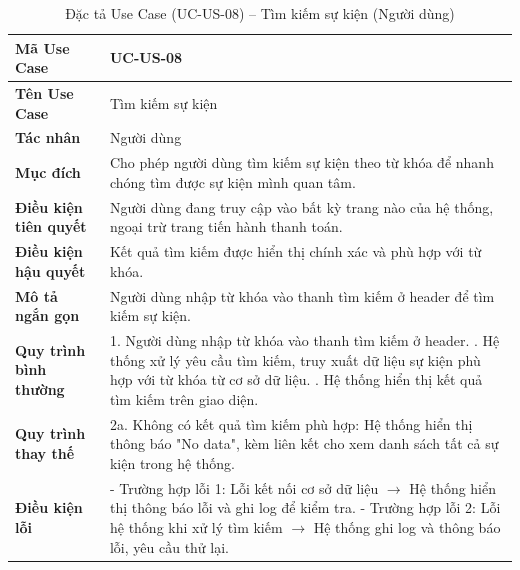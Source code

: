 \renewcommand{\arraystretch}{1.3}
\setlength{\tabcolsep}{4pt}
\begin{longtable}{|p{}|p{}|}
\caption{Đặc tả Use Case (UC-US-08) -- Tìm kiếm sự kiện (Người dùng) }\label{tab:uc_search_event}\\
\hline
\textbf{Mã Use Case} & UC-US-08 \\ \hline
\textbf{Tên Use Case} & Tìm kiếm sự kiện \\ \hline
\textbf{Tác nhân} & Người dùng \\ \hline
\textbf{Mục đích} & Cho phép người dùng tìm kiếm sự kiện theo từ khóa để nhanh chóng tìm được sự kiện mình quan tâm. \\ \hline
\textbf{Điều kiện tiên quyết} & Người dùng đang truy cập vào bất kỳ trang nào của hệ thống, ngoại trừ trang tiến hành thanh toán. \\ \hline
\textbf{Điều kiện hậu quyết} & Kết quả tìm kiếm được hiển thị chính xác và phù hợp với từ khóa. \\ \hline
\textbf{Mô tả ngắn gọn} & Người dùng nhập từ khóa vào thanh tìm kiếm ở header để tìm kiếm sự kiện. \\ \hline
\textbf{Quy trình bình thường} &
1. Người dùng nhập từ khóa vào thanh tìm kiếm ở header. \newline
2. Hệ thống xử lý yêu cầu tìm kiếm, truy xuất dữ liệu sự kiện phù hợp với từ khóa từ cơ sở dữ liệu. \newline
3. Hệ thống hiển thị kết quả tìm kiếm trên giao diện. \\ \hline
\textbf{Quy trình thay thế} &
2a. Không có kết quả tìm kiếm phù hợp: Hệ thống hiển thị thông báo "No data", kèm liên kết cho xem danh sách tất cả sự kiện trong hệ thống. \\ \hline
\textbf{Điều kiện lỗi} &
- Trường hợp lỗi 1: Lỗi kết nối cơ sở dữ liệu $\rightarrow$ Hệ thống hiển thị thông báo lỗi và ghi log để kiểm tra. \newline
- Trường hợp lỗi 2: Lỗi hệ thống khi xử lý tìm kiếm $\rightarrow$ Hệ thống ghi log và thông báo lỗi, yêu cầu thử lại. \\ \hline
\end{longtable}


